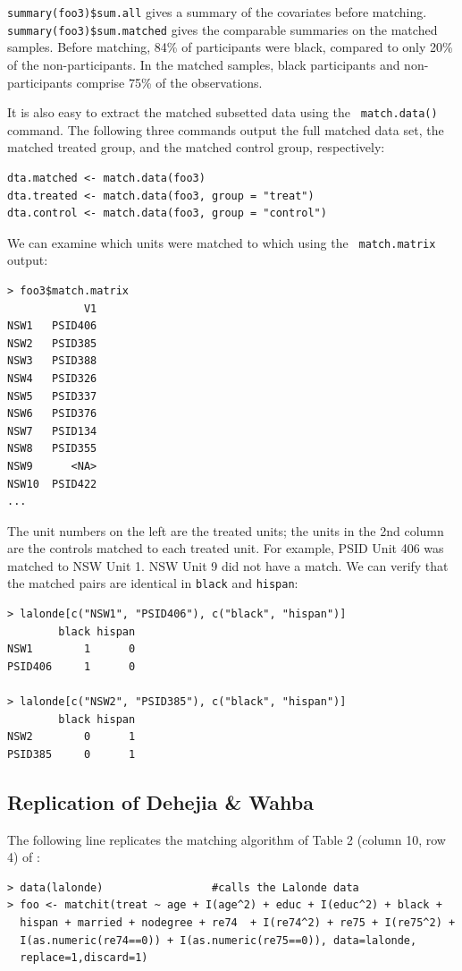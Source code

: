 \documentclass[oneside,letterpaper,titlepage]{article}
\begin{document}
{\tt summary(foo3)\$sum.all} gives a summary of the covariates before
matching.  {\tt summary(foo3)\$sum.matched} gives the comparable
summaries on the matched samples. Before matching, 84\% of
participants were black, compared to only 20\% of the
non-participants.  In the matched samples, black participants and
non-participants comprise 75\% of the observations.

It is also easy to extract the matched subsetted data using the {\tt
  match.data()} command.  The following three commands output the full
matched data set, the matched treated group, and the matched control
group, respectively:

\begin{verbatim}
dta.matched <- match.data(foo3)
dta.treated <- match.data(foo3, group = "treat")
dta.control <- match.data(foo3, group = "control")
\end{verbatim}

We can examine which units were matched to which using the {\tt
  match.matrix} output:
\begin{verbatim}
> foo3$match.matrix
            V1
NSW1   PSID406
NSW2   PSID385
NSW3   PSID388
NSW4   PSID326
NSW5   PSID337
NSW6   PSID376
NSW7   PSID134
NSW8   PSID355
NSW9      <NA>
NSW10  PSID422
...  
\end{verbatim}

The unit numbers on the left are the treated units; the units in the
2nd column are the controls matched to each treated unit.  For
example, PSID Unit 406 was matched to NSW Unit 1.  NSW Unit 9 did not
have a match.  We can verify that the matched pairs are identical in
\texttt{black} and \texttt{hispan}:

\begin{verbatim}
> lalonde[c("NSW1", "PSID406"), c("black", "hispan")]
        black hispan
NSW1        1      0
PSID406     1      0

> lalonde[c("NSW2", "PSID385"), c("black", "hispan")]
        black hispan
NSW2        0      1
PSID385     0      1
\end{verbatim}


\subsection{Replication of Dehejia \& Wahba}

The following line replicates the matching algorithm of Table 2
(column 10, row 4) of \citet{DehWah99}:

\begin{verbatim}
> data(lalonde)                 #calls the Lalonde data
> foo <- matchit(treat ~ age + I(age^2) + educ + I(educ^2) + black +
  hispan + married + nodegree + re74  + I(re74^2) + re75 + I(re75^2) +
  I(as.numeric(re74==0)) + I(as.numeric(re75==0)), data=lalonde,
  replace=1,discard=1)
\end{verbatim}
\end{document}
